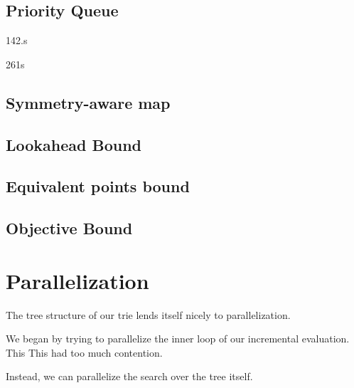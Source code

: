 \subsection{Priority Queue} \label{exp:priority}
142.s

261s

\subsection{Symmetry-aware map}

\subsection{Lookahead Bound}

\subsection{Equivalent points bound}

\subsection{Objective Bound}

\section{Parallelization}
The tree structure of our trie lends itself nicely to parallelization.

We began by trying to parallelize the inner loop of our incremental evaluation.
This 
This had too much contention.

Instead, we can parallelize the search over the tree itself.